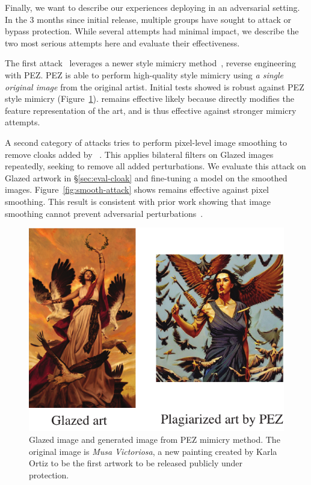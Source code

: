  Finally, we want to describe our
experiences deploying \system{} in an adversarial setting. In the 3 months
since initial release, multiple groups have sought to attack or bypass \system{}
protection. While several attempts had minimal impact, we describe the two
most serious attempts here and evaluate their effectiveness.

The first attack~\cite{marx-attack} leverages a newer style mimicry
method~\cite{wen2023hard}, reverse engineering with PEZ. PEZ is able to
perform high-quality style mimicry using \textit{a single original image}
from the original artist. Initial tests showed \system{} is robust
against PEZ style mimicry (Figure~\ref{fig:marx-attack}). \system{}
remains effective likely because \system{} directly modifies the
feature representation of the art, and is thus effective against stronger mimicry
attempts.

A second category of attacks tries to perform pixel-level image smoothing to remove
cloaks added by \system{}~\cite{smooth-attack}. This applies bilateral
filters on Glazed images repeatedly, seeking to remove all added perturbations. We
evaluate this attack on Glazed artwork in \S\ref{sec:eval-cloak} and
fine-tuning a model on the smoothed images. Figure~\ref{fig:smooth-attack}
shows \system{} remains effective against pixel smoothing. This result is
consistent with prior work showing that image smoothing cannot prevent
adversarial perturbations~\cite{zhang2020smooth}.

\begin{figure}[t]
  \centering
  \includegraphics[width=0.90\columnwidth]{plots/counter/marx-counter.pdf}
  \vspace{-0.1in}
  \caption{Glazed image and generated image from PEZ mimicry method. The
    original image is {\em Musa Victoriosa}, a new painting created by Karla
    Ortiz to be the first artwork to be released publicly under \system{} protection.}
  \label{fig:marx-attack}
\end{figure}

